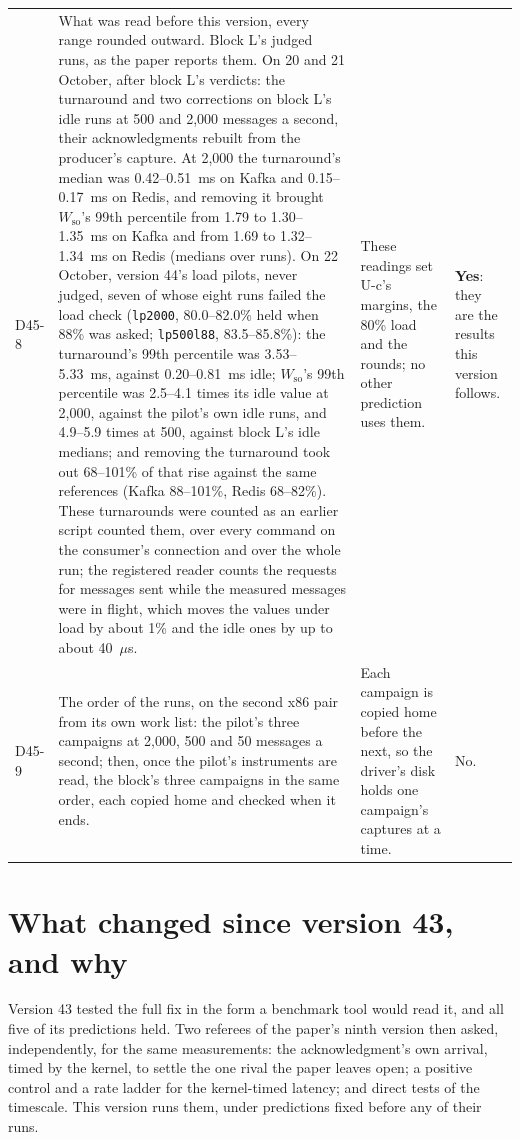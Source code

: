 \documentclass[11pt]{article}
\begin{document}
{\begin{longtable}{@{}p{1.1cm} >{\raggedright\arraybackslash}p{6.1cm} >{\raggedright\arraybackslash}p{6.0cm} >{\raggedright\arraybackslash}p{2.2cm}@{}}
D45-8 & What was read before this version, every range rounded outward. Block L's judged runs, as the paper reports them. On 20 and 21 October, after block L's verdicts: the turnaround and two corrections on block L's idle runs at 500 and 2,000 messages a second, their acknowledgments rebuilt from the producer's capture. At 2,000 the turnaround's median was 0.42--0.51~ms on Kafka and 0.15--0.17~ms on Redis, and removing it brought $W_{\mathrm{so}}$'s 99th percentile from 1.79 to 1.30--1.35~ms on Kafka and from 1.69 to 1.32--1.34~ms on Redis (medians over runs). On 22 October, version 44's load pilots, never judged, seven of whose eight runs failed the load check (\texttt{lp2000}, 80.0--82.0\% held when 88\% was asked; \texttt{lp500l88}, 83.5--85.8\%): the turnaround's 99th percentile was 3.53--5.33~ms, against 0.20--0.81~ms idle; $W_{\mathrm{so}}$'s 99th percentile was 2.5--4.1 times its idle value at 2,000, against the pilot's own idle runs, and 4.9--5.9 times at 500, against block L's idle medians; and removing the turnaround took out 68--101\% of that rise against the same references (Kafka 88--101\%, Redis 68--82\%). These turnarounds were counted as an earlier script counted them, over every command on the consumer's connection and over the whole run; the registered reader counts the requests for messages sent while the measured messages were in flight, which moves the values under load by about 1\% and the idle ones by up to about 40~$\mu$s. & These readings set U-c's margins, the 80\% load and the rounds; no other prediction uses them. & \textbf{Yes}: they are the results this version follows. \\
D45-9 & The order of the runs, on the second x86 pair from its own work list: the pilot's three campaigns at 2,000, 500 and 50 messages a second; then, once the pilot's instruments are read, the block's three campaigns in the same order, each copied home and checked when it ends. & Each campaign is copied home before the next, so the driver's disk holds one campaign's captures at a time. & No. \\
\bottomrule
\end{longtable}}

\section*{What changed since version 43, and why}
Version 43 tested the full fix in the form a benchmark tool would read it, and all five of its
predictions held. Two referees of the paper's ninth version then asked, independently, for the
same measurements: the acknowledgment's own arrival, timed by the kernel, to settle the one rival
the paper leaves open; a positive control and a rate ladder for the kernel-timed latency; and
direct tests of the timescale. This version runs them, under predictions fixed before any of
their runs.
\end{document}
